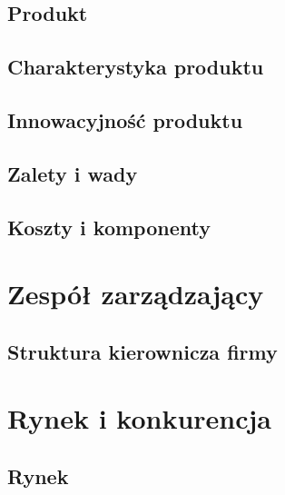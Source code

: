 \documentclass[12pt]{article}
\begin{document}


\subsection{Produkt}
\subsection{Charakterystyka produktu}
\subsection{Innowacyjność produktu}
\subsection{Zalety i wady}
\subsection{Koszty i komponenty}

\section{Zespół zarządzający}


\subsection{Struktura kierownicza firmy}

\section{Rynek i konkurencja}

\subsection{Rynek}
\end{document}
